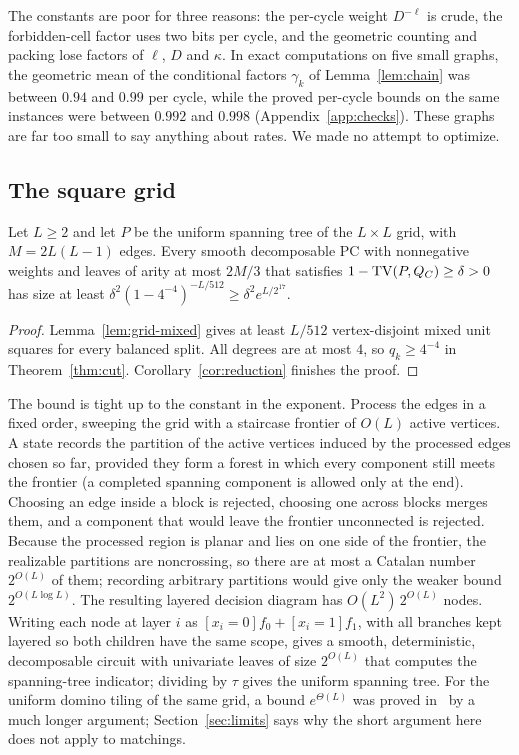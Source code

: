 The constants are poor for three reasons: the per-cycle weight $D^{-\ell}$ is crude, the forbidden-cell factor uses two bits per cycle, and the geometric counting and packing lose factors of $\ell$, $D$ and $\kappa$. In exact computations on five small graphs, the geometric mean of the conditional factors $\gamma_k$ of Lemma~\ref{lem:chain} was between $0.94$ and $0.99$ per cycle, while the proved per-cycle bounds on the same instances were between $0.992$ and $0.998$ (Appendix~\ref{app:checks}). These graphs are far too small to say anything about rates. We made no attempt to optimize.

\subsection{The square grid}

\begin{corollary}[grid]\label{cor:grid}
Let $L\ge2$ and let $P$ be the uniform spanning tree of the $L\times L$ grid, with $M=2L(L-1)$ edges. Every smooth decomposable PC with nonnegative weights and leaves of arity at most $2M/3$ that satisfies $1-\mathrm{TV}(P,Q_C)\ge\delta>0$ has size at least $\delta^2(1-4^{-4})^{-L/512}\ge\delta^2e^{L/2^{17}}$.
\end{corollary}

\begin{proof}
Lemma~\ref{lem:grid-mixed} gives at least $L/512$ vertex-disjoint mixed unit squares for every balanced split. All degrees are at most $4$, so $q_k\ge4^{-4}$ in Theorem~\ref{thm:cut}. Corollary~\ref{cor:reduction} finishes the proof.
\end{proof}

The bound is tight up to the constant in the exponent. Process the edges in a fixed order, sweeping the grid with a staircase frontier of $O(L)$ active vertices. A state records the partition of the active vertices induced by the processed edges chosen so far, provided they form a forest in which every component still meets the frontier (a completed spanning component is allowed only at the end). Choosing an edge inside a block is rejected, choosing one across blocks merges them, and a component that would leave the frontier unconnected is rejected. Because the processed region is planar and lies on one side of the frontier, the realizable partitions are noncrossing, so there are at most a Catalan number $2^{O(L)}$ of them; recording arbitrary partitions would give only the weaker bound $2^{O(L\log L)}$. The resulting layered decision diagram has $O(L^2)\,2^{O(L)}$ nodes. Writing each node at layer $i$ as $[x_i=0]f_0+[x_i=1]f_1$, with all branches kept layered so both children have the same scope, gives a smooth, deterministic, decomposable circuit with univariate leaves of size $2^{O(L)}$ that computes the spanning-tree indicator; dividing by $\tau$ gives the uniform spanning tree. For the uniform domino tiling of the same grid, a bound $e^{\Theta(L)}$ was proved in~\cite{Blaschke26Dimers} by a much longer argument; Section~\ref{sec:limits} says why the short argument here does not apply to matchings.

